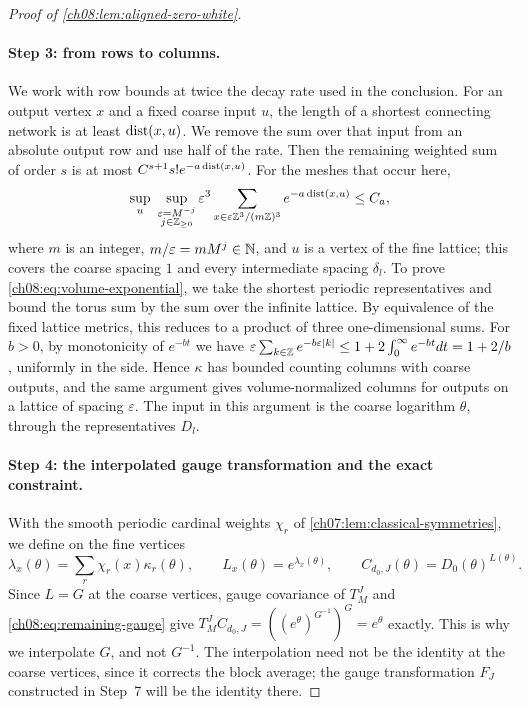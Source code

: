 \begin{proof}[Proof of \cref{ch08:lem:aligned-zero-white}]
\paragraph{Step 3: from rows to columns.}
We work with row bounds at twice the decay rate used in the conclusion. For an output vertex $x$ and a fixed coarse input $u$, the length of a shortest connecting network is at least $\operatorname{dist}(x,u)$. We remove the sum over that input from an absolute output row and use half of the rate. Then the remaining weighted sum of order $s$ is at most $C^{s+1}s!e^{-a\operatorname{dist}(x,u)}$. For the meshes that occur here,
\begin{equation}\label{ch08:eq:volume-exponential}
 \sup_u\ \sup_{\substack{\varepsilon=M^{-j}\\j\in\mathbb Z_{\ge0}}}
 \varepsilon^3\sum_{x\in\varepsilon\mathbb Z^3/(m\mathbb Z)^3}
                         e^{-a\operatorname{dist}(x,u)}\le C_a,
\end{equation}
where $m$ is an integer, $m/\varepsilon=mM^j\in\mathbb N$, and $u$ is a vertex of the fine lattice; this covers the coarse spacing $1$ and every intermediate spacing $\delta_l$. To prove \eqref{ch08:eq:volume-exponential}, we take the shortest periodic representatives and bound the torus sum by the sum over the infinite lattice. By equivalence of the fixed lattice metrics, this reduces to a product of three one-dimensional sums. For $b>0$, by monotonicity of $e^{-bt}$ we have $\varepsilon\sum_{k\in\mathbb Z}e^{-b\varepsilon|k|}\le1+2\int_0^\infty e^{-bt}dt=1+2/b$, uniformly in the side. Hence $\kappa$ has bounded counting columns with coarse outputs, and the same argument gives volume-normalized columns for outputs on a lattice of spacing $\varepsilon$. The input in this argument is the coarse logarithm $\theta$, through the representatives $D_l$.

\paragraph{Step 4: the interpolated gauge transformation and the exact constraint.}
With the smooth periodic cardinal weights $\chi_r$ of \cref{ch07:lem:classical-symmetries}, we define on the fine vertices
\begin{equation}\label{ch08:eq:positive-alignment}
 \lambda_x(\theta)=\sum_r\chi_r(x)\kappa_r(\theta),\qquad
 L_x(\theta)=e^{\lambda_x(\theta)},\qquad
 C_{d_0,J}(\theta)=D_0(\theta)^{L(\theta)}.
\end{equation}
Since $L=G$ at the coarse vertices, gauge covariance of $T_M^J$ and \eqref{ch08:eq:remaining-gauge} give $T_M^JC_{d_0,J}=((e^\theta)^{G^{-1}})^G=e^\theta$ exactly. This is why we interpolate $G$, and not $G^{-1}$. The interpolation need not be the identity at the coarse vertices, since it corrects the block average; the gauge transformation $F_J$ constructed in Step~7 will be the identity there.


\end{proof}
